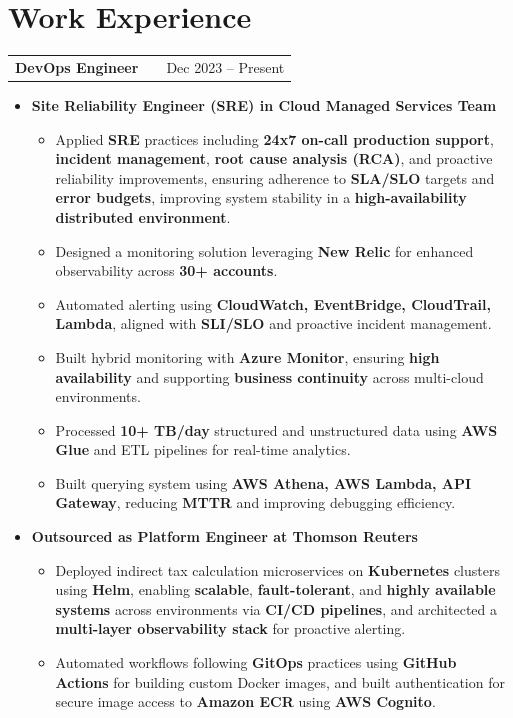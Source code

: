 \documentclass[a4paper,10.999999pt]{article}
\makeatletter
\newenvironment{joblong}[2]
        {
        \begin{tabularx}{\linewidth}{@{}l X r@{}}
        \textbf{#1} & \hfill &  #2 \\[-1pt]
        \end{tabularx}
        \vspace{-3.2pt}
        \begin{minipage}[t]{\linewidth}
        \begin{itemize}[nosep, after=\strut, leftmargin=0.5em, itemsep=1pt, label=\raisebox{0.2ex}{\tiny$\circ$}]
        }
        {
        \end{itemize}
        \end{minipage}
        \vspace{-3.2pt}
        }
\makeatother
\begin{document}

    \section{Work Experience}

    \begin{joblong}{DevOps Engineer}{Dec 2023 -- Present}
    Intuitive.Cloud
    \item \textbf{Site Reliability Engineer (SRE) in Cloud Managed Services Team}
    \begin{itemize}

    \item Applied \textbf{SRE} practices including \textbf{24x7 on-call production support}, \textbf{incident management}, \textbf{root cause analysis (RCA)}, and proactive reliability improvements, ensuring adherence to \textbf{SLA/SLO} targets and \textbf{error budgets}, improving system stability in a \textbf{high-availability distributed environment}.
    \item Designed a monitoring solution leveraging \textbf{New Relic} for enhanced observability across \textbf{30+ accounts}.
    \item Automated alerting using \textbf{CloudWatch, EventBridge, CloudTrail, Lambda}, aligned with \textbf{SLI/SLO} and proactive incident management.

    \item Built hybrid monitoring with \textbf{Azure Monitor}, ensuring \textbf{high availability} and supporting \textbf{business continuity} across multi-cloud environments.
    \item Processed \textbf{10+ TB/day} structured and unstructured data using \textbf{AWS Glue} and ETL pipelines for real-time analytics.
    \item Built querying system using \textbf{AWS Athena, AWS Lambda, API Gateway}, reducing \textbf{MTTR} and improving debugging efficiency.

    \end{itemize}
    \vspace{5pt}

    \item \textbf{Outsourced as Platform Engineer at Thomson Reuters}
    \begin{itemize}
    \item Deployed indirect tax calculation microservices on \textbf{Kubernetes} clusters using \textbf{Helm}, enabling \textbf{scalable}, \textbf{fault-tolerant}, and \textbf{highly available systems} across environments via \textbf{CI/CD pipelines}, and architected a \textbf{multi-layer observability stack} for proactive alerting.
    \item Automated workflows following \textbf{GitOps} practices using \textbf{GitHub Actions} for building custom Docker images, and built authentication for secure image access to \textbf{Amazon ECR} using \textbf{AWS Cognito}.
    \end{itemize}


\end{joblong}
\end{document}
